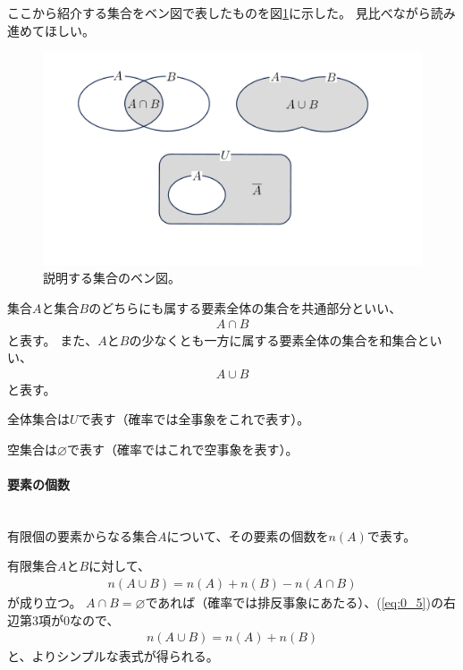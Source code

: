 \documentclass[luatexja,fontsize=12pt]{jlreq}\usepackage{ifthen}\newcounter{enlarge}\setcounter{enlarge}{1}
\begin{document}
ここから紹介する集合をベン図で表したものを図\ref{f:0.1}に示した。
見比べながら読み進めてほしい。
\begin{figure}[] 
\centering 
\includegraphics[width=10truecm]{f0_1.pdf}
\captionsetup{width=.9\linewidth}
\caption{%
説明する集合のベン図。
}
\label{f:0.1}
\end{figure}%

集合$A$と集合$B$のどちらにも属する要素全体の集合を共通部分といい、
\begin{align} \label{eq:0_3}
A \cap B
\end{align}
と表す。
また、$A$と$B$の少なくとも一方に属する要素全体の集合を和集合といい、
\begin{align} \label{eq:0_4}
A \cup B
\end{align}
と表す。

全体集合は$U$で表す（確率では全事象をこれで表す）。

空集合は$\varnothing$で表す（確率ではこれで空事象を表す）。
\mbox{}\\

\paragraph{要素の個数}\mbox{}\\
\indent
有限個の要素からなる集合$A$について、その要素の個数を$n(A)$で表す。

有限集合$A$と$B$に対して、
\begin{align} \label{eq:0_5}
n(A \cup B)=n(A)+n(B)-n(A \cap B)
\end{align}
が成り立つ。
$A \cap B=\varnothing $であれば（確率では排反事象にあたる）、(\ref{eq:0_5})の右辺第3項が0なので、
\begin{align} \label{eq:0_6}
n(A \cup B)=n(A)+n(B)
\end{align}
と、よりシンプルな表式が得られる。
\mbox{}\\
\end{document}
